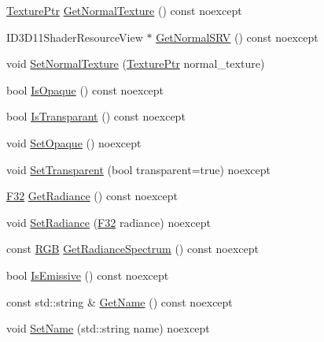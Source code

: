 \begin{DoxyCompactItemize}
\item 
\mbox{\hyperlink{namespacemage_1_1rendering_a6f3ae54f825328465b0cdde0f0de4a36}{Texture\+Ptr}} \mbox{\hyperlink{classmage_1_1rendering_1_1_material_a1ae7786ebd627d3e7ecaf2dc671f497d}{Get\+Normal\+Texture}} () const noexcept
\item 
I\+D3\+D11\+Shader\+Resource\+View $\ast$ \mbox{\hyperlink{classmage_1_1rendering_1_1_material_a8617392cee8e8609671be3f4147a5934}{Get\+Normal\+S\+RV}} () const noexcept
\item 
void \mbox{\hyperlink{classmage_1_1rendering_1_1_material_a1a1ae2ba12c62c1d076f04124f1f64f6}{Set\+Normal\+Texture}} (\mbox{\hyperlink{namespacemage_1_1rendering_a6f3ae54f825328465b0cdde0f0de4a36}{Texture\+Ptr}} normal\+\_\+texture)
\item 
bool \mbox{\hyperlink{classmage_1_1rendering_1_1_material_af750917e67bdaf7e47129617102887ab}{Is\+Opaque}} () const noexcept
\item 
bool \mbox{\hyperlink{classmage_1_1rendering_1_1_material_ae60d1b61ebd38d3e329a519b2f2c3dad}{Is\+Transparant}} () const noexcept
\item 
void \mbox{\hyperlink{classmage_1_1rendering_1_1_material_a23741c39e6ad9a8d12b7793bc3da4131}{Set\+Opaque}} () noexcept
\item 
void \mbox{\hyperlink{classmage_1_1rendering_1_1_material_a8da0e0ed4df1e9ce0c7381d88b6d6c48}{Set\+Transparent}} (bool transparent=true) noexcept
\item 
\mbox{\hyperlink{namespacemage_aa97e833b45f06d60a0a9c4fc22ae02c0}{F32}} \mbox{\hyperlink{classmage_1_1rendering_1_1_material_a5bfbc1bc67731126af7cf33b286bb07b}{Get\+Radiance}} () const noexcept
\item 
void \mbox{\hyperlink{classmage_1_1rendering_1_1_material_ae41261db79de572b75e2615abadc2aaa}{Set\+Radiance}} (\mbox{\hyperlink{namespacemage_aa97e833b45f06d60a0a9c4fc22ae02c0}{F32}} radiance) noexcept
\item 
const \mbox{\hyperlink{structmage_1_1_r_g_b}{R\+GB}} \mbox{\hyperlink{classmage_1_1rendering_1_1_material_af8a3171b34409593673f1279e3f9ba29}{Get\+Radiance\+Spectrum}} () const noexcept
\item 
bool \mbox{\hyperlink{classmage_1_1rendering_1_1_material_acf52f6bc5f849928751e10157bdb3c3c}{Is\+Emissive}} () const noexcept
\item 
const std\+::string \& \mbox{\hyperlink{classmage_1_1rendering_1_1_material_a7ba9bfe03829a11de89198b0e343630d}{Get\+Name}} () const noexcept
\item 
void \mbox{\hyperlink{classmage_1_1rendering_1_1_material_aacbd397564b9995bd66c4b7d16553c1c}{Set\+Name}} (std\+::string name) noexcept
\end{DoxyCompactItemize}
